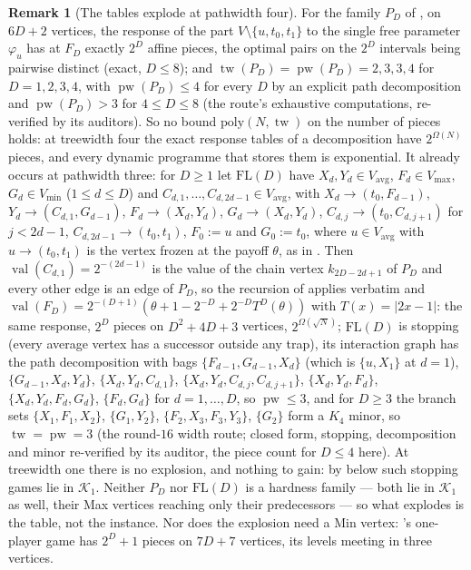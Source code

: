 \documentclass[11pt]{article}
\theoremstyle{plain}
\theoremstyle{definition}
\newtheorem{remark}[theorem]{Remark}
\DeclareMathOperator{\val}{val}
\newcommand{\Vmax}{V_{\max}}
\newcommand{\Vmin}{V_{\min}}
\newcommand{\Vavg}{V_{\mathrm{avg}}}
\begin{document}
\begin{remark}[The tables explode at pathwidth four]\label{rem:fold-width}
For the family $P_D$ of , on $6D+2$ vertices, the response
of the part $V\setminus\{u,t_0,t_1\}$ to the single free parameter
$\varphi_u$ has at $F_D$ exactly $2^{D}$ affine pieces, the optimal pairs
on the $2^{D}$ intervals being pairwise distinct (exact, $D\le8$); and
$\operatorname{tw}(P_D)=\operatorname{pw}(P_D)=2,3,3,4$ for $D=1,2,3,4$, with $\operatorname{pw}(P_D)\le4$ for every
$D$ by an explicit path decomposition and $\operatorname{pw}(P_D)>3$ for $4\le D\le8$
(the route's exhaustive computations, re-verified by its auditors). So no
bound $\mathrm{poly}(N,\operatorname{tw})$ on the number of pieces holds: at treewidth
four the exact response tables of a decomposition have $2^{\Omega(N)}$
pieces, and every dynamic programme that stores them is exponential.
It already occurs at pathwidth three: for $D\ge1$ let $\mathrm{FL}(D)$
have $X_d,Y_d\in\Vavg$, $F_d\in\Vmax$, $G_d\in\Vmin$ ($1\le d\le D$) and
$C_{d,1},\dots,C_{d,2d-1}\in\Vavg$, with $X_d\to(t_0,F_{d-1})$,
$Y_d\to(C_{d,1},G_{d-1})$, $F_d\to(X_d,Y_d)$, $G_d\to(X_d,Y_d)$,
$C_{d,j}\to(t_0,C_{d,j+1})$ for $j<2d-1$, $C_{d,2d-1}\to(t_0,t_1)$,
$F_0:=u$ and $G_0:=t_0$, where $u\in\Vavg$ with $u\to(t_0,t_1)$ is the
vertex frozen at the payoff $\theta$, as in . Then $\val(C_{d,1})=2^{-(2d-1)}$ is the value of the
chain vertex $k_{2D-2d+1}$ of $P_D$ and every other edge is an edge of
$P_D$, so the recursion of  applies verbatim and
$\val(F_D)=2^{-(D+1)}(\theta+1-2^{-D}+2^{-D}T^{D}(\theta))$ with
$T(x)=|2x-1|$: the same response, $2^{D}$ pieces on $D^{2}+4D+3$ vertices,
$2^{\Omega(\sqrt N)}$; $\mathrm{FL}(D)$ is stopping (every average vertex
has a successor outside any trap), its interaction graph has the
path decomposition with bags
$\{F_{d-1},G_{d-1},X_d\}$ (which is $\{u,X_1\}$ at $d=1$), $\{G_{d-1},X_d,Y_d\}$, $\{X_d,Y_d,C_{d,1}\}$,
$\{X_d,Y_d,C_{d,j},C_{d,j+1}\}$, $\{X_d,Y_d,F_d\}$, $\{X_d,Y_d,F_d,G_d\}$,
$\{F_d,G_d\}$ for $d=1,\dots,D$, so $\operatorname{pw}\le3$, and for
$D\ge3$ the branch sets $\{X_1,F_1,X_2\}$, $\{G_1,Y_2\}$,
$\{F_2,X_3,F_3,Y_3\}$, $\{G_2\}$ form a $K_4$ minor, so
$\operatorname{tw}=\operatorname{pw}=3$ (the round-$16$ width route;
closed form, stopping, decomposition and minor re-verified by its
auditor, the piece count for $D\le4$ here). At treewidth one there is no
explosion, and nothing to gain: by  below such
stopping games lie in $\mathcal K_1$. Neither $P_D$ nor $\mathrm{FL}(D)$
is a hardness family --- both lie in $\mathcal K_1$ as well, their Max
vertices reaching only their predecessors --- so what explodes is the
table, not the instance. Nor does the explosion need a Min vertex:
's one-player game has $2^{D}+1$ pieces on
$7D+7$ vertices, its levels meeting in three vertices.
\end{remark}
\end{document}
